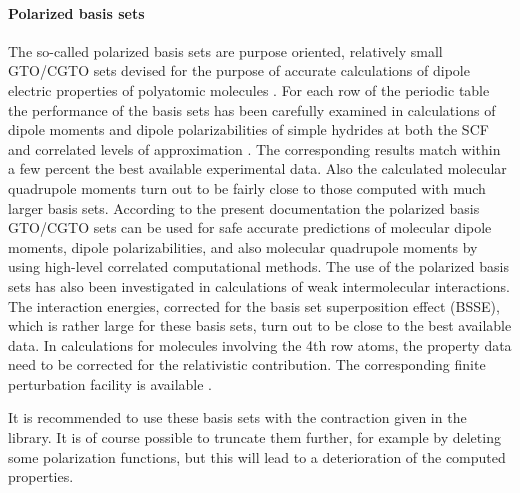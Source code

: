 \paragraph{Polarized basis sets}

The so-called polarized basis sets are purpose oriented, relatively
small GTO/CGTO sets devised for the purpose of accurate calculations
of dipole electric properties of polyatomic molecules 
\cite{polI,polII,polIII,polIV,polV}.
For each row of the periodic table the performance of the basis sets
has been carefully examined in calculations of dipole moments and
dipole polarizabilities of simple hydrides at both the SCF and
correlated levels of approximation \cite{polI,polII,polIII,polIV,polV}.
The corresponding results match within a few percent the best
available experimental data. Also the calculated molecular quadrupole
moments turn out to be fairly close to those computed with much larger
basis sets. According to the present documentation the polarized basis
GTO/CGTO sets can be used for safe accurate predictions of molecular
dipole moments, dipole polarizabilities, and also molecular quadrupole
moments by using high-{}level correlated computational methods. The use
of the polarized basis sets has also been investigated in calculations
of weak intermolecular interactions. The interaction energies,
corrected for the basis set superposition effect (BSSE), which is
rather large for these basis sets, turn out to be close to the best
available data. In calculations for molecules involving the 4th row
atoms, the property data need to be corrected for the relativistic
contribution. The corresponding finite perturbation facility is
available \cite{polVI,polVII}.
 
It is recommended to use these basis sets with the contraction given
in the library. It is of course possible to truncate them further,
for example by deleting some polarization functions, but this will
lead to a deterioration of the computed properties.

